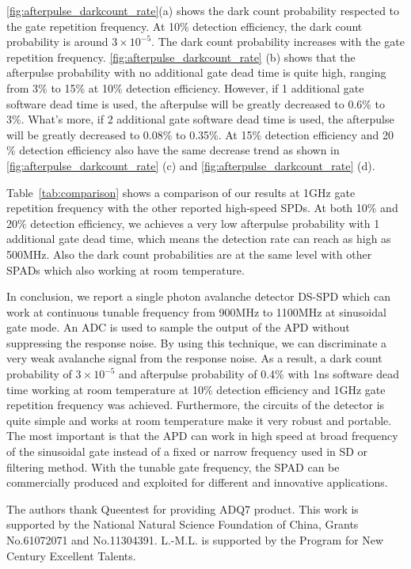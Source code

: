 \documentclass[%
 reprint,
superscriptaddress,
 amsmath,amssymb,
 aps,
]{revtex4-1}
\begin{document}
\autoref{fig:afterpulse_darkcount_rate}(a) shows the dark count probability respected to the gate repetition frequency. At 10\% detection efficiency, the dark count probability is around $3\times10^{-5}$. The dark count probability increases with the gate repetition frequency. \autoref{fig:afterpulse_darkcount_rate} (b) shows that the afterpulse probability with no additional gate dead time is quite high, ranging from 3\% to 15\% at 10\% detection efficiency. However, if 1 additional gate software dead time is used, the afterpulse will be greatly decreased to 0.6\% to 3\%. What's more, if 2 additional gate software dead time is used, the afterpulse will be greatly decreased to 0.08\% to 0.35\%. At 15\% detection efficiency and 20 \% detection efficiency also have the same decrease trend as shown in \autoref{fig:afterpulse_darkcount_rate} (c) and \autoref{fig:afterpulse_darkcount_rate} (d).
%

Table~\ref{tab:comparison} shows a comparison of our results at 1GHz gate repetition frequency with the other reported high-speed SPDs. At both 10\% and 20\% detection efficiency, we achieves a very low afterpulse probability with 1 additional gate dead time, which means the detection rate can reach as high as 500MHz. Also the dark count probabilities are at the same level with other SPADs which also working at room temperature.

In conclusion, we report a single photon avalanche detector DS-SPD which can work at continuous tunable frequency from 900MHz to 1100MHz at sinusoidal gate mode. An ADC is used to sample the output of the APD without suppressing the response noise. By using this technique, we can discriminate a very weak avalanche signal from the response noise. As a result, a dark count probability of $3\times10^{-5}$ and afterpulse probability  of 0.4\% with 1ns software dead time working at room temperature at 10\% detection efficiency and 1GHz gate repetition frequency was achieved. Furthermore, the circuits of the detector is quite simple and works at room temperature make it very robust and portable. The most important is that the APD can work in high speed at broad frequency of the sinusoidal gate instead of a fixed or narrow frequency used in SD or filtering method. With the tunable gate frequency, the SPAD can be commercially produced and exploited for different and innovative applications.

The authors thank Queentest for providing ADQ7 product. This work is supported by the National Natural Science Foundation of China, Grants No.61072071 and No.11304391. L.-M.L. is supported by the Program for New Century Excellent Talents.

\end{document}

